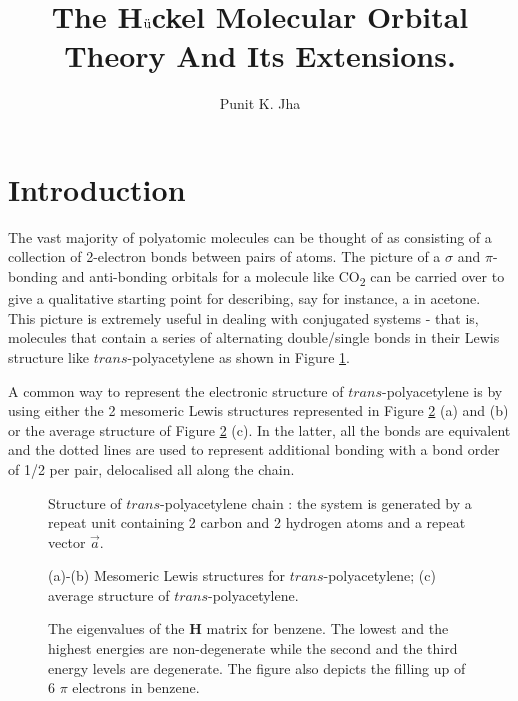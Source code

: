 \documentclass[9pt,twocolumn,twoside]{optica}
\title{The H$\ddot{\text u}$ckel Molecular Orbital Theory And Its Extensions. }
\author[1,*]{Punit K. Jha}
\affil[1]{The University of Illinois at Urbana-Champaign}
\affil[*]{Corresponding author: punit2@illinois.edu}
\begin{document}
\maketitle
\thispagestyle{fancy}

\section{Introduction}

The vast majority of polyatomic molecules can be thought of as consisting of a collection of 2-electron bonds between pairs of atoms. The picture of a $\sigma$ and $\pi$-bonding and anti-bonding orbitals for a molecule like CO\textsubscript{2} can be carried over to give a qualitative starting point for describing, say for instance, a   in acetone. This picture is extremely useful in dealing with conjugated systems - that is, molecules that contain a series of alternating double/single bonds in their Lewis structure like $trans$-polyacetylene as shown in Figure \ref{fig:trans-poly}.

A common way to represent the electronic structure of $trans$-polyacetylene is by using either the 2 mesomeric Lewis structures represented in Figure \ref{fig:trans-poly2} (a) and (b) or the average structure of Figure \ref{fig:trans-poly2} (c). In the latter,  all the  bonds are equivalent and the dotted lines are used to represent additional  bonding with a bond order of 1/2 per  pair, delocalised all along the chain.

\begin{figure}[htbp]
\centering
{}
\caption{Structure of $trans$-polyacetylene chain : the system is generated by a repeat unit containing 2 carbon and 2 hydrogen atoms and a repeat vector $\vec{a}$. }
\label{fig:trans-poly}
\end{figure}


\begin{figure}[htbp]
\centering
{}
\caption{(a)-(b) Mesomeric Lewis structures for $trans$-polyacetylene;  (c) average structure of $trans$-polyacetylene.}
\label{fig:trans-poly2}
\end{figure}

\begin{figure}[htbp]
\centering
{}
\caption{The eigenvalues of the \textbf{H} matrix for benzene. The lowest and the highest energies are non-degenerate while the second and the third energy levels are degenerate. The figure also depicts the filling up of 6 $\pi$ electrons in benzene.}
\label{fig:ben_e1}
\end{figure}
\end{document}
